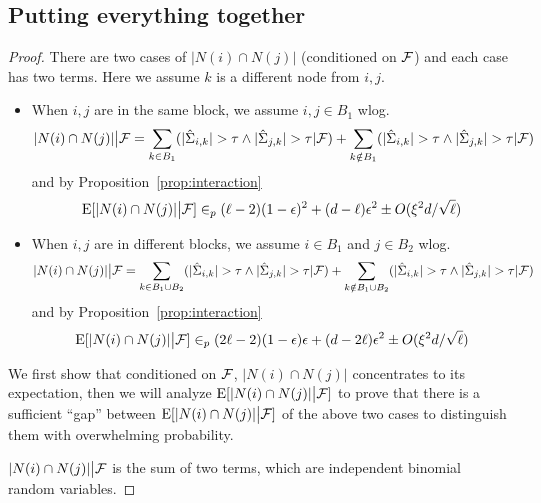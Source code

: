 \subsection{Putting everything together}
\begin{proof}

There are two cases of $|N(i) \cap N(j)|$ (conditioned on $\mathcal{F}$) and each case has two terms. Here we assume $k$ is a different node from $i,j$.
\begin{itemize}
    \item When $i,j$ are in the same block, we assume $i,j \in B_1$ wlog. 
    \begin{equation}
        |N(i) \cap N(j)| \big| \mathcal{F} = \sum_{k \in B_1}(|\hat \Sigma_{i,k}| > \tau \wedge |\hat \Sigma_{j,k}| > \tau| \mathcal{F}) + \sum_{k \notin B_1}(|\hat \Sigma_{i,k}| > \tau \wedge |\hat \Sigma_{j,k}| > \tau| \mathcal{F})
    \end{equation}
    and by Proposition~\ref{prop:interaction}
    \begin{equation}
        \mathrm{E}[|N(i) \cap N(j)|\big| \mathcal{F}] \in_p  (\ell-2)(1 -\epsilon)^2 + (d - \ell)\epsilon^2 \pm O(\xi^2d/\sqrt{\ell}) 
    \end{equation}
    \item When $i,j$ are in different blocks, we assume $i\in B_1$ and $j \in B_2$ wlog. 
    \begin{equation}
        |N(i) \cap N(j)| \big| \mathcal{F}= \sum_{k \in B_1\cup B_2}(|\hat \Sigma_{i,k}| > \tau \wedge |\hat \Sigma_{j,k}| > \tau| \mathcal{F}) + \sum_{k \notin B_1 \cup B_2}(|\hat \Sigma_{i,k}| > \tau \wedge |\hat \Sigma_{j,k}| > \tau| \mathcal{F})
    \end{equation}
    and by Proposition~\ref{prop:interaction}
    \begin{equation}
        \mathrm{E}[|N(i) \cap N(j)|\big| \mathcal{F}] \in_p  (2\ell-2)(1 -\epsilon)\epsilon + (d - 2\ell)\epsilon^2 \pm O(\xi^2d/\sqrt{\ell}) 
    \end{equation}
\end{itemize}

We first show that conditioned on $\mathcal{F}$, $|N(i) \cap N(j)|$ concentrates to its expectation, then we will analyze $\mathrm{E}[|N(i) \cap N(j)|\big| \mathcal{F}]$ to prove that there is a sufficient ``gap'' between $\mathrm{E}[|N(i) \cap N(j)|\big| \mathcal{F}]$ of the above two cases to distinguish them with overwhelming probability.


$|N(i) \cap N(j)| \big| \mathcal{F}$ is the sum of two terms, which are independent binomial random variables.


\end{proof}
